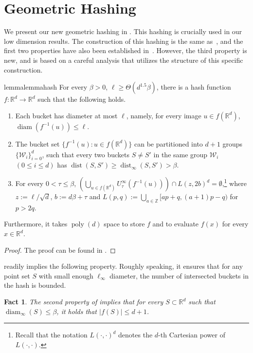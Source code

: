 \documentclass[11pt,letterpaper]{article}
\theoremstyle{plain}
\newtheorem{fact}[theorem]{Fact}
\theoremstyle{definition}
\theoremstyle{remark}
\def\ZZ{{\mathbb{Z}}}
\DeclareMathOperator{\poly}{poly}
\DeclareMathOperator{\dist}{dist}
\DeclareMathOperator{\diam}{diam}
\begin{document}
     \section{Geometric Hashing}
\label{sec:hash}

We present our new geometric hashing in .
This hashing is crucially used in our low dimension results.
The construction of this hashing is the same as~\cite[Theorem 5.3]{CJKVY22},
and the first two properties have also been established in~\cite{CJKVY22}.
However, the third property is new, and is based on a careful analysis that utilizes the structure of this specific construction.
\begin{restatable}{lemma}{lemmahash}
    \label{lemma:hash}
    For every $\beta>0$, $\ell \geq \Theta(d^{1.5} \beta)$, there is a hash function $f : \mathbb{R}^{d} \to \mathbb{R}^{d}$ such that the following holds.
    \begin{enumerate}
        \item  Each bucket has diameter at most $\ell$, namely, for every image $u \in f(\mathbb{R}^{d})$, $\diam(f^{-1}(u)) \leq \ell$.
        \item  The bucket set $\{ f^{-1}(u) : u \in f(\mathbb{R}^d) \}$ can be partitioned into $d + 1$ groups $\{ \mathcal{W}_i \}_{i=0}^d$,
        such that every two buckets $S \neq S'$ in the same group $\mathcal{W}_i$ $(0 \leq i \leq d)$ has $\dist(S, S') \geq \dist_\infty(S, S') > \beta$.
\item  For every $0<\tau\leq \beta$, $\left(\bigcup_{u \in f(\mathbb{R}^{d})} U^\infty_\tau(f^{-1}(u)) \right) \cap L(z, 2b)^d = \emptyset$,\footnote{Recall that the notation $L(\cdot, \cdot)^d$ denotes the $d$-th Cartesian power of $L(\cdot, \cdot)$.}
    where $z:=\ell/ \sqrt{d}$, $b := d\beta +\tau$ and $L(p, q):= \bigcup_{a\in \ZZ} [ap + q, (a+1)p - q)$ for $p > 2q$.
    \end{enumerate} 
    Furthermore, it takes $\poly(d)$ space to store $f$ and to evaluate $f(x)$ for every $x \in \mathbb{R}^d$.
\end{restatable}
\begin{proof}
    The proof can be found in .
\end{proof}

 readily implies the following property.
Roughly speaking, it ensures that for any point set $S$ with small enough $\ell_\infty$ diameter, the number of intersected buckets in the hash is bounded.
\begin{fact}
    \label{fact:consistent_hash}
    The second property of 
    implies that for every $S \subset \mathbb{R}^d$ such that $\diam_\infty(S) \leq \beta$,
    it holds that $|f(S)| \leq d + 1$.
\end{fact}
\end{document}
